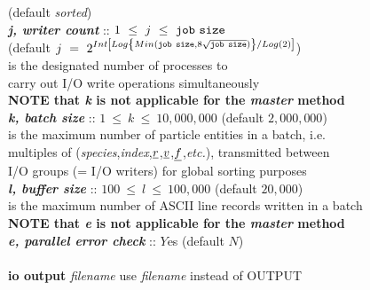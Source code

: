 \begin{tabbing}
\>                                              \> \phantom{x} (default {\em sorted}) \\
\>                                              \> \phantom{xxx} {\bf \em j, writer count} :: $1~\le~j~\le~{\tt job~size}$ \\
\>                                              \> \phantom{xxxx} (default $j~=~2^{Int\left[Log\left\{Min({\tt job~size},8\sqrt{\tt job~size})\right\}/Log(2)\right]}$) \\
\>                                              \> \phantom{xxxx} is the designated number of processes to \\
\>                                              \> \phantom{xxxx} carry out I/O write operations simultaneously \\
\>                                              \> {\bf NOTE that {\em k} is not applicable for the {\em master} method} \\
\>                                              \> \phantom{xxx} {\bf \em k, batch size} :: $1~\le~k~\le~10,000,000$ (default $2,000,000$) \\
\>                                              \> \phantom{xxxx} is the maximum number of particle entities in a batch, i.e. \\
\>                                              \> \phantom{xxxx} multiples of ({\em species},{\em index},$\mbox{$\underline{r}$}$,$\mbox{$\underline{v}$}$,$\mbox{$\underline{f}$}$,{\em etc.}), transmitted between \\
\>                                              \> \phantom{xxxx} I/O groups (= I/O writers) for global sorting purposes \\
\>                                              \> {\bf \em l, buffer size} :: $100~\le~l~\le~100,000$ (default $20,000$) \\
\>                                              \> \phantom{x} is the maximum number of ASCII line records written in a batch \\
\>                                              \> {\bf NOTE that {\em e} is not applicable for the {\em master} method} \\
\>                                              \> \phantom{xxx} {\bf \em e, parallel error check} :: $Y$es (default $N$) \\
\>                                              \> \\
\> {\bf io output}  {\it filename}              \> use {\it filename} instead of OUTPUT \\
\>                                              \> \\

\end{tabbing}
